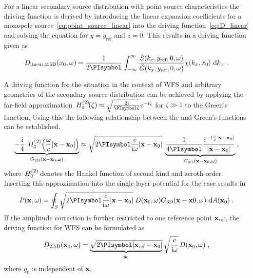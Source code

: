 For a linear secondary source distribution with point source characteristics the
\twohalfD driving function is derived by introducing the
linear expansion coefficients for a monopole
source~\eqref{eq:point_source_linear} into the driving
function~\eqref{eq:D_linear} and solving the equation for $y = y_\text{ref}$ and
$z = 0$. This results in a \twohalfD driving function given
as\autocite[][(3.77)]{Ahrens2012}
%
\begin{equation}
    D_{\text{linear},\twohalfD}(x_0,\omega) = \frac{1}{2\PI} \int_{-\infty}^\infty
    \frac{\breve{S}(k_x,y_\text{ref},0,\omega)}
    {\breve{G}(k_x,y_\text{ref},0,\omega)} \chi(k_x,x_0) \, \D{k_x} \qp
    \label{eq:D_linear_25D}
\end{equation}
%

A driving function for the \twohalfD situation in the context of \ac{WFS}
and arbitrary \twoD geometries of the secondary source distribution
can be achieved by applying the
far-field approximation\autocite[][(4.23)]{Williams1999}
$\H{0}{2}(\zeta) \approx \sqrt{\frac{2\I}{\PI \zeta}}
\E^{-\I\zeta}$ for $\zeta \gg 1$ to the \twoD Green's function.
Using this the
following relationship between the \twoD and \threeD
Green's functions can be established.
%
\begin{multline} 
    \underbrace{
    -\frac{\I}{4} \;\H{0}{2}\left(\omegac |\x-\x_0|\right)
    }_{G_\twoD(\x-\x_0,\omega)}
    \approx
    \sqrt{2\PI \frac{c}{\I\omega} |\x-\x_0|} \;
    \underbrace{
        \frac{1}{4 \PI} \frac{\E^{-\I\omegac|\x-\x_0|}}{|\x-\x_0|}
    }_{G_\threeD(\x-\x_0,\omega)} \qc
    \label{eq:25D_approximation}
\end{multline}
%
where $\,H_{0}^{(2)}\!$ denotes the Hankel function of second kind and zeroth
order.
Inserting this approximation into the single-layer potential for the \twoD
case results in
%
\begin{equation}
    P(\x,\omega) = \oint_S \sqrt{2\PI \frac{c}{\I\omega} |\x-\x_0|} \;
    D(\x_0,\omega) G_\threeD(\x-\x0,\omega) \, \D A(\x_0) \qp
    \label{eq:single_layer_potential_25D}
\end{equation}
%
If the amplitude correction is further restricted to one reference point
$\mathbf{x}_\text{ref}$, the \twohalfD driving function for \ac{WFS} can be formulated
as
%
\begin{equation}
    D_\twohalfD(\x_0,\omega) = \underbrace{\sqrt{2\PI |\x_\text{ref}-\x_0|}}_{g_0}
    \sqrt{\frac{c}{\I\omega}} \,
    D(\x_0,\omega) \qc
    \label{eq:D25D_wfs}
\end{equation}
%
where $g_0$ is independent of $\mathbf{x}$.

